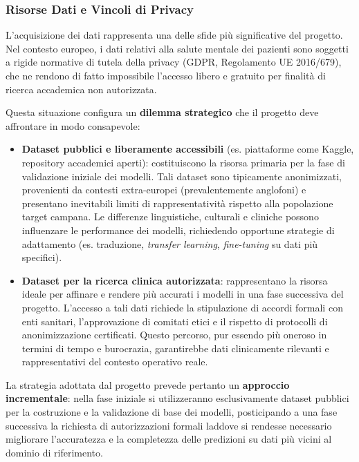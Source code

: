 \subsubsection{Risorse Dati e Vincoli di Privacy}
\label{subsubsec:risorse_dati}

L'acquisizione dei dati rappresenta una delle sfide più significative del progetto. Nel contesto europeo, i dati relativi alla salute mentale dei pazienti sono soggetti a rigide normative di tutela della privacy (GDPR, Regolamento UE 2016/679), che ne rendono di fatto impossibile l'accesso libero e gratuito per finalità di ricerca accademica non autorizzata.

Questa situazione configura un \textbf{dilemma strategico} che il progetto deve affrontare in modo consapevole:

\begin{itemize}
    \item \textbf{Dataset pubblici e liberamente accessibili} (es. piattaforme come Kaggle, repository accademici aperti): costituiscono la risorsa primaria per la fase di validazione iniziale dei modelli. Tali dataset sono tipicamente anonimizzati, provenienti da contesti extra-europei (prevalentemente anglofoni) e presentano inevitabili limiti di rappresentatività rispetto alla popolazione target campana. Le differenze linguistiche, culturali e cliniche possono influenzare le performance dei modelli, richiedendo opportune strategie di adattamento (es. traduzione, \textit{transfer learning}, \textit{fine-tuning} su dati più specifici).

    \item \textbf{Dataset per la ricerca clinica autorizzata}: rappresentano la risorsa ideale per affinare e rendere più accurati i modelli in una fase successiva del progetto. L'accesso a tali dati richiede la stipulazione di accordi formali con enti sanitari, l'approvazione di comitati etici e il rispetto di protocolli di anonimizzazione certificati. Questo percorso, pur essendo più oneroso in termini di tempo e burocrazia, garantirebbe dati clinicamente rilevanti e rappresentativi del contesto operativo reale.
\end{itemize}

La strategia adottata dal progetto prevede pertanto un \textbf{approccio incrementale}: nella fase iniziale si utilizzeranno esclusivamente dataset pubblici per la costruzione e la validazione di base dei modelli, posticipando a una fase successiva la richiesta di autorizzazioni formali laddove si rendesse necessario migliorare l'accuratezza e la completezza delle predizioni su dati più vicini al dominio di riferimento.

